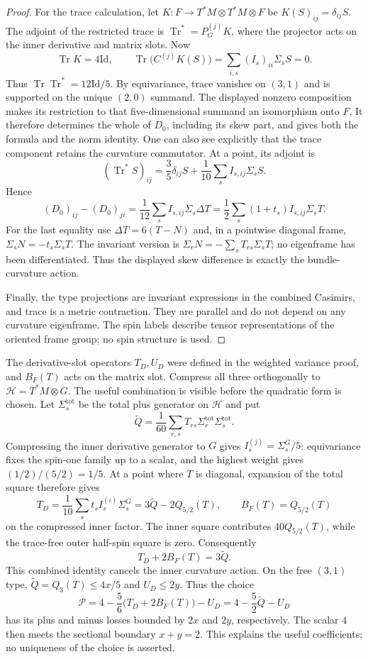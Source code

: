 \begin{proof}
For the trace calculation, let
\(K:F\to T^*M\otimes T^*M\otimes F\) be
\(K(S)_{ij}=\delta_{ij}S\).  The adjoint of the restricted trace is
\(\operatorname{Tr}^*=P_{G}^{(j)}K\), where the projector acts
on the inner derivative and matrix slots.  Now
\[
 \operatorname{Tr}K=4\mathrm{Id},
 \qquad
 \operatorname{Tr}\bigl(C^{(j)}K(S)\bigr)
 =\sum_{i,s}(I_s)_{ii}\Sigma_sS=0.
\]
Thus \(\operatorname{Tr}\operatorname{Tr}^*=12\mathrm{Id}/5\).
By equivariance, trace vanishes on \((3,1)\) and is supported on the
unique \((2,0)\) summand.  The displayed nonzero composition makes its
restriction to that five-dimensional summand an isomorphism onto
\(F\).  It therefore determines the whole of \(D_0\), including
its skew part, and gives both the formula and the norm identity.
One can also see explicitly that the trace component retains the
curvature commutator. At a point, its adjoint is
\[
 (\operatorname{Tr}^*S)_{ij}
 =\frac35\delta_{ij}S+\frac1{10}\sum_s I_{s,ij}\Sigma_sS.
\]
Hence
\[
 (D_0)_{ij}-(D_0)_{ji}
 =\frac1{12}\sum_s I_{s,ij}\Sigma_s\Delta T
 =\frac12\sum_s(1+t_s)I_{s,ij}\Sigma_sT.
\]
For the last equality use $\Delta T=6(T-N)$ and, in a pointwise
diagonal frame, $\Sigma_sN=-t_s\Sigma_sT$. The invariant version is
$\Sigma_rN=-\sum_sT_{rs}\Sigma_sT$; no eigenframe has been
differentiated. Thus the displayed skew difference is exactly the
bundle-curvature action.

Finally, the type projections are invariant expressions in the combined
Casimirs, and trace is a metric contraction.  They are parallel and do
not depend on any curvature eigenframe.  The spin labels describe tensor
representations of the oriented frame group; no spin structure is used.
\end{proof}

The derivative-slot operators $T_D,U_D$ were defined in the weighted
variance proof, and $B_F(T)$ acts on the matrix slot. Compress all three
orthogonally to $\mathcal H=T^*M\otimes G$. The useful combination is
visible before the quadratic form is chosen. Let
$\Sigma_s^{\mathrm{tot}}$ be the total plus generator on $\mathcal H$ and put
\[
 \widetilde Q=\frac1{60}
   \sum_{r,s}T_{rs}\Sigma_r^{\mathrm{tot}}\Sigma_s^{\mathrm{tot}}.
\]
Compressing the inner derivative generator to $G$ gives
$I_s^{(j)}=\Sigma_s^G/5$: equivariance fixes the spin-one family up to a
scalar, and the highest weight gives $(1/2)/(5/2)=1/5$. At a point where
$T$ is diagonal, expansion of the total square therefore gives
\[
 T_D=\frac1{10}\sum_s t_s I_s^{(i)}\Sigma_s^G
     =3\widetilde Q-2Q_{5/2}(T),\qquad
 B_F(T)=Q_{5/2}(T)
\]
on the compressed inner factor. The inner square contributes
$40Q_{5/2}(T)$, while the trace-free outer half-spin square is zero.
Consequently
\[
 T_D+2B_F(T)=3\widetilde Q.
\]
This combined identity cancels the inner curvature action. On the free
$(3,1)$ type, $\widetilde Q=Q_3(T)\le4x/5$ and $U_D\le2y$. Thus the choice
\[
 \mathcal P=4-\frac56\bigl(T_D+2B_F(T)\bigr)-U_D
            =4-\frac52\widetilde Q-U_D
\]
has its plus and minus losses bounded by $2x$ and $2y$, respectively.
The scalar $4$ then meets the sectional boundary $x+y=2$. This explains
the useful coefficients; no uniqueness of the choice is asserted.

